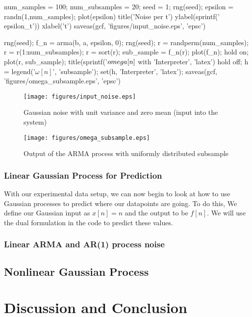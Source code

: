\documentclass[11pt, twoside]{article}   	%
\newenvironment{matlab}{\comment}{\endcomment}
\begin{document}
\begin{matlab}
num_samples = 100;
num_subsamples = 20;
seed = 1; 
rng(seed); 
epsilon = randn(1,num_samples);
plot(epsilon) 
title('Noise per t')
ylabel(sprintf('\\epsilon_t'))
xlabel('t')
saveas(gcf, 'figures/input_noise.eps', 'epsc')

rng(seed); 
f_n = arma(b, a, epsilon, 0);
rng(seed); 
r = randperm(num_samples); %
r = r(1:num_subsamples); %
r = sort(r); %
sub_sample = f_n(r); 
plot(f_n); hold on; 
plot(r, sub_sample); 
title(sprintf('$\\omega[n]$ with %
   'Interpreter', 'latex')
hold off; 
h = legend('$\omega[n]$', 'subsample');
set(h, 'Interpreter', 'latex');
saveas(gcf, 'figures/omega_subsample.eps', 'epsc')

\end{matlab}
\begin{figure}[h]
\centering
\texttt{[image: figures/input\_noise.eps]}
\caption{Gaussian noise with unit variance and zero mean (input into the system)}
\label{fig:input_noise} 
\end{figure}
\FloatBarrier

\begin{figure}[h]
\centering
\texttt{[image: figures/omega\_subsample.eps]}
\caption{Output of the ARMA process with uniformly distributed subsample}
\label{fig:omega_subsample} 
\end{figure}
\FloatBarrier

\subsubsection{Linear Gaussian Process for Prediction}
With our experimental data setup, we can now begin to look at how to use
Gaussian processes to predict where our datapoints are going. To do this, 
We define our Gaussian input as $x[n] = n$ and the output to be $f[n]$. 
We will use the dual formulation in the code to predict these values. 




\subsubsection{Linear ARMA and AR(1) process noise}
\subsection{Nonlinear Gaussian Process}

\section{Discussion and Conclusion}



\end{document}
